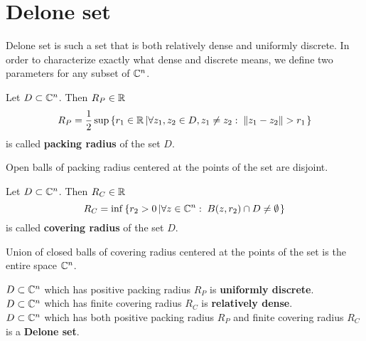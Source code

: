 \documentclass[text.tex]{subfiles}
\begin{document}
\section{Delone set} %
Delone set is such a set that is both relatively dense and uniformly discrete. In order to characterize exactly what dense and discrete means, we define two parameters for any subset of $\mathbb{C}^n$. 

\begin{definition}\label{def_deloneSetPacking}
Let $D\subset \mathbb{C}^n$. Then $R_P\in\mathbb{R}$
$$R_P = \frac{1}{2}\sup\left\{ r_1\in \mathbb{R}\left| \forall z_1,z_2\in D, z_1\neq z_2:\; \lVert z_1-z_2\rVert >r_1 \right. \right\}$$
is called \textbf{packing radius} of the set $D$. 
\end{definition}

\begin{remark}
Open balls of packing radius centered at the points of the set are disjoint. 
\end{remark}

\begin{definition}\label{def_deloneSetCovering}
Let $D\subset \mathbb{C}^n$. Then $R_C\in\mathbb{R}$
$$R_C = \inf\left\{ r_2>0\left| \forall z\in\mathbb{C}^n:\; B(z,r_2)\cap D \neq \emptyset \right. \right\}$$
is called \textbf{covering radius} of the set $D$. 
\end{definition}

\begin{remark}
Union of closed balls of covering radius centered at the points of the set is the entire space $\mathbb{C}^n$. 
\end{remark}

\begin{definition}\label{def_deloneSet}\leavevmode

\noindent
$D\subset \mathbb{C}^n$ which has positive packing radius $R_P$ is \textbf{uniformly discrete}.\\
\noindent
$D\subset \mathbb{C}^n$ which has finite covering radius $R_C$ is \textbf{relatively dense}.\\
\noindent
$D\subset \mathbb{C}^n$ which has both positive packing radius $R_P$ and finite covering radius $R_C$ is a \textbf{Delone set}.
\end{definition}
\end{document}
